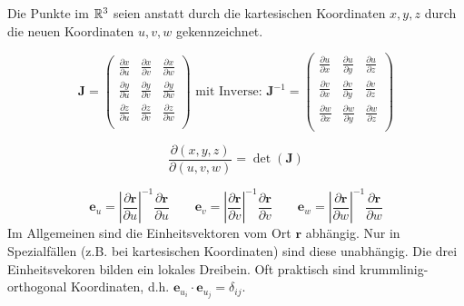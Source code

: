 Die Punkte im $\mathbb{R}^3$ seien anstatt durch die kartesischen Koordinaten $x,y,z$ durch die neuen Koordinaten $u,v,w$ gekennzeichnet.

\begin{frameddefn}
\[
\mathbf{J} =
\left(\begin{array}{rrr} 
	\frac{\partial x}{\partial u} & \frac{\partial x}{\partial v} & \frac{\partial x}{\partial w} \\ 
	\frac{\partial y}{\partial u} & \frac{\partial y}{\partial v} & \frac{\partial y}{\partial w} \\ 
	\frac{\partial z}{\partial u} & \frac{\partial z}{\partial v} & \frac{\partial z}{\partial w} \\ 
\end{array}\right)
\textrm{ mit Inverse: }
\mathbf{J}^{-1} = 
\left(\begin{array}{rrr} 
	\frac{\partial u}{\partial x} & \frac{\partial u}{\partial y} & \frac{\partial u}{\partial z} \\ 
	\frac{\partial v}{\partial x} & \frac{\partial v}{\partial y} & \frac{\partial v}{\partial z} \\ 
	\frac{\partial w}{\partial x} & \frac{\partial w}{\partial y} & \frac{\partial w}{\partial z} \\ 
\end{array}\right)
\]
\end{frameddefn}

\begin{frameddefn}[Funktionaldeterminante]
\[	
\frac{\partial (x,y,z)}{\partial (u,v,w)} = \det(\mathbf{J})
\]
\end{frameddefn}

\begin{framedprop}
\[
\mathbf{e}_u = \left| \frac{\partial \mathbf{r}}{\partial u} \right|^{-1} \frac{\partial \mathbf{r}}{\partial u} \qquad
 \mathbf{e}_v = \left| \frac{\partial \mathbf{r}}{\partial v} \right|^{-1} \frac{\partial \mathbf{r}}{\partial v} \qquad
 \mathbf{e}_w = \left| \frac{\partial \mathbf{r}}{\partial w} \right|^{-1} \frac{\partial \mathbf{r}}{\partial w}
\]
Im Allgemeinen sind die Einheitsvektoren vom Ort $\mathbf{r}$ abhängig. Nur in Spezialfällen (z.B. bei kartesischen Koordinaten) sind diese unabhängig. Die drei Einheitsvekoren bilden ein lokales Dreibein. Oft praktisch sind krummlinig-orthogonal Koordinaten, d.h. $\mathbf{e}_{u_{i}} \cdot \mathbf{e}_{u_{j}} = \delta_{ij}$.
\end{framedprop}

